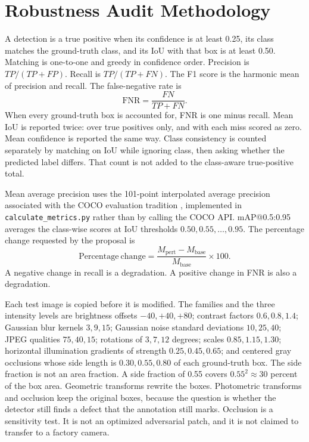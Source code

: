 \documentclass[conference]{IEEEtran}
\begin{document}
\section{Robustness Audit Methodology}
\label{sec:method}
A detection is a true positive when its confidence is at least 0.25, its class matches the ground-truth class, and its IoU with that box is at least 0.50. Matching is one-to-one and greedy in confidence order. Precision is $TP/(TP+FP)$. Recall is $TP/(TP+FN)$. The F1 score is the harmonic mean of precision and recall. The false-negative rate is
\begin{equation}
\mathrm{FNR}=\frac{FN}{TP+FN}.
\end{equation}
When every ground-truth box is accounted for, FNR is one minus recall. Mean IoU is reported twice: over true positives only, and with each miss scored as zero. Mean confidence is reported the same way. Class consistency is counted separately by matching on IoU while ignoring class, then asking whether the predicted label differs. That count is not added to the class-aware true-positive total.

Mean average precision uses the 101-point interpolated average precision associated with the COCO evaluation tradition \cite{lin2014coco}, implemented in \texttt{calculate\_metrics.py} rather than by calling the COCO API. mAP@0.5:0.95 averages the class-wise scores at IoU thresholds $0.50,0.55,\ldots,0.95$. The percentage change requested by the proposal is
\begin{equation}
\mathrm{Percentage\ change}=\frac{M_{\mathrm{pert}}-M_{\mathrm{base}}}{M_{\mathrm{base}}}\times 100.
\end{equation}
A negative change in recall is a degradation. A positive change in FNR is also a degradation.

Each test image is copied before it is modified. The families and the three intensity levels are brightness offsets $-40,+40,+80$; contrast factors $0.6,0.8,1.4$; Gaussian blur kernels $3,9,15$; Gaussian noise standard deviations $10,25,40$; JPEG qualities $75,40,15$; rotations of $3,7,12$ degrees; scales $0.85,1.15,1.30$; horizontal illumination gradients of strength $0.25,0.45,0.65$; and centered gray occlusions whose side length is $0.30,0.55,0.80$ of each ground-truth box. The side fraction is not an area fraction. A side fraction of 0.55 covers $0.55^{2}\approx 30$ percent of the box area. Geometric transforms rewrite the boxes. Photometric transforms and occlusion keep the original boxes, because the question is whether the detector still finds a defect that the annotation still marks. Occlusion is a sensitivity test. It is not an optimized adversarial patch, and it is not claimed to transfer to a factory camera.
\end{document}
